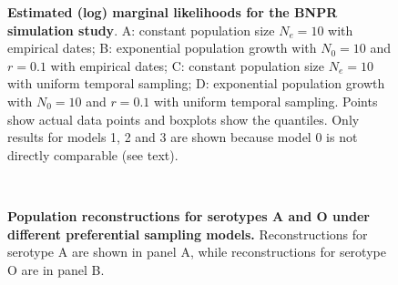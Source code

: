 \documentclass[a4paper,10pt]{article}
\begin{document}
\begin{center}
\begin{figure}[H]
\begin{center}
\end{center}
\caption{\textbf{Estimated (log) marginal likelihoods for the BNPR simulation study}.
A: constant population size $N_e = 10$ with empirical dates; B: exponential population growth with $N_0 = 10$ and $r = 0.1$ with empirical dates; C: constant population size $N_e = 10$ with uniform temporal sampling; D: exponential population growth with $N_0 = 10$ and $r = 0.1$ with uniform temporal sampling.
Points show actual data points and boxplots show the quantiles.
Only results for models 1, 2 and 3 are shown because model 0 is not directly comparable (see text).
}
\label{sfig:BNPR_simu_marglikes}
\end{figure}
\end{center}
\newpage
\begin{center}
\begin{figure}[H]
\begin{center}
 \\
\end{center}
\caption{
\textbf{Population reconstructions for serotypes A and O under different preferential sampling models.}
Reconstructions for serotype A are shown in panel A, while reconstructions for serotype O are in panel B.
}
\label{sfig:full_reconstructions_BNPR}
\end{figure}
\end{center}
\end{document}
